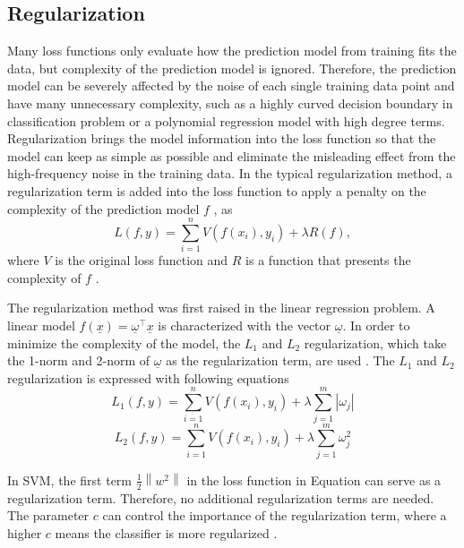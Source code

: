 \subsection{Regularization}

Many loss functions only evaluate how the prediction model from training fits the data, but complexity of the prediction model is ignored. Therefore, the prediction model can be severely affected by the noise of each single training data point and have many unnecessary complexity, such as a highly curved decision boundary in classification problem or a polynomial regression model with high degree terms. Regularization brings the model information into the loss function so that the model can keep as simple as possible and eliminate the misleading effect from the high-frequency noise in the training data. In the typical regularization method, a regularization term is added into the loss function to apply a penalty on the complexity of the prediction model $f$ , as
\begin{equation}
L(f,y)=\sum_{i=1}^{n}V(f(x_{i}),y_{i})+\lambda R(f),
\end{equation}
where $V$ is the original loss function and $R$ is a function that presents the complexity of $f$ \cite{poggio1985computational}. 

The regularization method was first raised in the linear regression problem. A linear model $f(\underline{x})=\underline{\omega}^\top \underline{x}$ is characterized with the vector $\underline{\omega}$. In order to minimize the complexity of the model, the $L_{1}$ and $L_{2}$ regularization, which take the 1-norm and 2-norm of $\underline{\omega}$ as the regularization term, are used \cite{ng2004feature}. The $L_{1}$ and $L_{2}$ regularization is expressed with following equations
\begin{equation}
L_{1}(f,y)=\sum_{i=1}^{n}V(f(x_{i}),y_{i})+\lambda \sum_{j=1}^{m} \left| \omega_{j}\right|
\end{equation}
\begin{equation}
L_{2}(f,y)=\sum_{i=1}^{n}V(f(x_{i}),y_{i})+\lambda \sum_{j=1}^{m}\omega_{j}^2
\end{equation}

In SVM, the first term $\frac{1}{2}\left \| w^{2} \right \|$ in the loss function in Equation  can serve as a regularization term. Therefore, no additional regularization terms are needed. The parameter $c$ can control the importance of the regularization term, where a higher $c$ means the classifier is more regularized \cite{evgeniou2000regularization}. 

